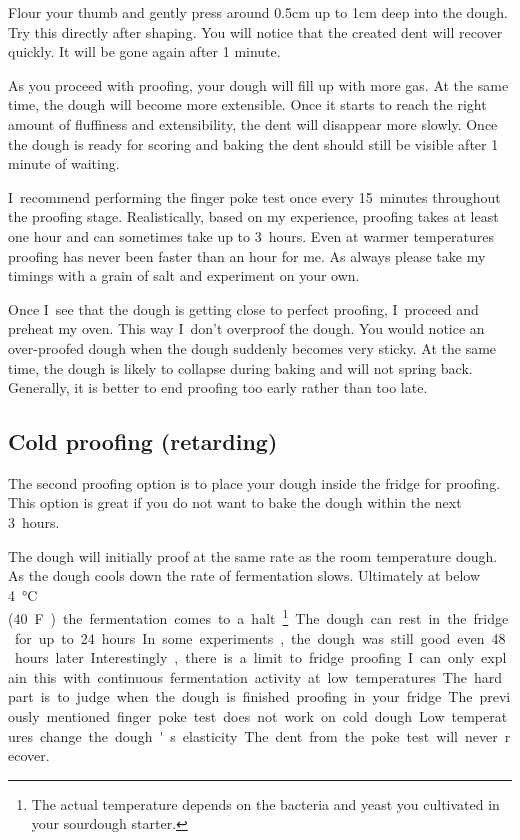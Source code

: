 Flour your thumb and gently press around 0.5cm up to 1cm deep into the dough.
Try this directly after shaping. You will notice that the created dent will
recover quickly. It will be gone again after 1 minute.

As you proceed with proofing, your dough will fill up with more gas. At the
same time, the dough will become more extensible. Once it starts to reach the
right amount of fluffiness and extensibility, the dent will disappear more slowly.
Once the dough is ready for scoring and baking the dent should still be visible after
1 minute of waiting.

I~recommend performing the finger poke test once every 15~minutes throughout
the proofing stage. Realistically, based on my experience, proofing takes at least
one hour and can sometimes take up to 3~hours. Even at warmer temperatures proofing
has never been faster than an hour for me. As always please take my timings with
a grain of salt and experiment on your own.

Once I~see that the dough is getting close to perfect proofing, I~proceed and
preheat my oven. This way I~don't overproof the dough. You would notice an
over-proofed dough when the dough suddenly becomes very sticky. At the same
time, the dough is likely to collapse during baking and will not spring back.
Generally, it is better to end proofing too early rather than too late.

\subsection{Cold proofing (retarding)}

The second proofing option is to place your dough inside the fridge for
proofing. This option is great if you do not want to bake the dough
within the next 3~hours.

The dough will initially proof at the same rate as the room temperature dough.
As the dough cools down the rate of fermentation slows. Ultimately at below
\qty{4}{\degreeCelsius} (\qty{40}F) the fermentation comes to a halt\footnote{The actual temperature
depends on the bacteria and yeast you cultivated in your sourdough
starter.}. The dough can rest in the fridge for up to 24~hours. In some
experiments, the dough was still good even 48~hours later. Interestingly,
there is a limit to fridge proofing. I~can only explain this with continuous
fermentation activity at low temperatures.

The hard part is to judge when the dough is finished proofing in your fridge.
The previously mentioned finger poke test does not work on cold dough. Low
temperatures change the dough's elasticity. The dent from the poke test
will never recover.

